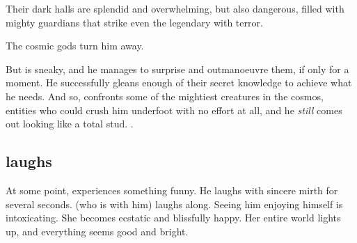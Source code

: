 \begin{garbage}
Their dark halls are splendid and overwhelming, but also dangerous, filled with mighty guardians that strike even the legendary \Ishnaruchaefir{} with terror. 


The cosmic gods turn him away. 


But \Ishnaruchaefir{} is sneaky, and he manages to surprise and outmanoeuvre them, if only for a moment. He successfully gleans enough of their secret knowledge to achieve what he needs. And so, \Ishnaruchaefir{} confronts some of the mightiest creatures in the cosmos, entities who could crush him underfoot with no effort at all, and he \emph{still} comes out looking like a total stud. .  







\subsection{\Ishnaruchaefir{} laughs}
At some point, \Ishnaruchaefir{} experiences something funny. 
He laughs with sincere mirth for several seconds. 
\Criseis{} (who is with him) laughs along. 
Seeing him enjoying himself is intoxicating. 
She becomes ecstatic and blissfully happy. 
Her entire world lights up, and everything seems good and bright. 


\end{garbage}
